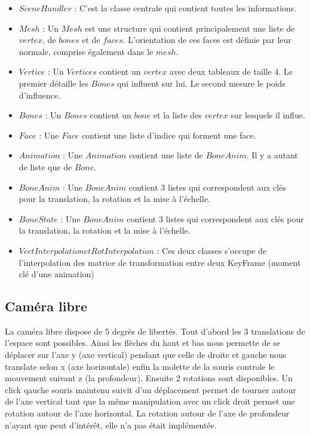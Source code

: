 \documentclass[a4paper]{report}
\begin{document}
\begin{itemize}
\item $SceneHandler$ : C'est la classe centrale qui contient toutes les informations.
\item $Mesh$ : Un $Mesh$ est une structure qui contient principalement une liste de $vertex$, de $bones$ et de $faces$. L'orientation de ces faces est définie par leur normale, comprise également dans le $mesh$.
\item $Vertice$ : Un $Vertices$ contient un $vertex$ avec deux tableaux de taille 4. Le premier détaille les $Bones$ qui influent sur lui. Le second mesure le poids d'influence.
\item $Bones$ : Un $Bones$ contient un $bone$ et la liste des $vertex$ sur lesquels il influe.
\item $Face$ : Une $Face$ contient une liste d'indice qui forment une face.
\item $Animation$ : Une $Animation$ contient une liste de $BoneAnim$. Il y a autant de liste que de $Bone$.
\item $BoneAnim$ : Une $BoneAnim$ contient 3 listes qui correspondent aux clés pour la translation, la rotation et la mise à l'échelle.
\item $BoneState$ : Une $BoneAnim$ contient 3 listes qui correspondent aux clés pour la translation, la rotation et la mise à l'échelle.
\item $VectInterpolation et RotInterpolation$ : Ces deux classes s'occupe de l'interpolation des matrice de transformation entre deux KeyFrame (moment clé d'une animation)
\end{itemize}

\subsection{Caméra libre}
\par
La caméra libre dispose de 5 degrès de libertés. Tout d'abord les 3 translations de l'espace sont possibles. Ainsi les flèches du haut et bas nous permette de se déplacer sur l'axe y (axe vertical) pendant que celle de droite et gauche nous translate selon x (axe horizontale) enfin la molette de la souris controle le mouvement suivant z (la profondeur). Ensuite 2 rotations sont disponibles. Un click qauche souris maintenu suivit d'un déplacement permet de tourner autour de l'axe vertical tant que la même manipulation avec un click droit permet une rotation autour de l'axe horizontal. La rotation autour de l'axe de profondeur n'ayant que peut d'intérêt, elle n'a pas était implémentée. 
\end{document}
